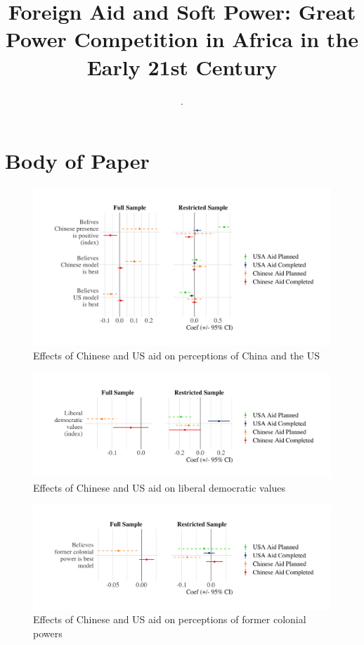 \documentclass[9pt]{article}
\title{Foreign Aid and Soft Power: Great Power Competition in Africa in the Early 21st Century}
\author{.}
\begin{document}
\maketitle
\tableofcontents

\setlength{\tabcolsep}{5pt}

\newpage
\section{Body of Paper}

\begin{figure}[H]
\centering
\includegraphics[width=1\textwidth]{figures/figure_01.png}
\caption{Effects of Chinese and US aid on perceptions of China and the US}
\end{figure}

\begin{figure}[H]
\centering
\includegraphics[width=1\textwidth]{figures/figure_02.png}
\caption{Effects of Chinese and US aid on liberal democratic values}
\end{figure}

\begin{figure}[H]
\centering
\includegraphics[width=1\textwidth]{figures/figure_03.png}
\caption{Effects of Chinese and US aid on perceptions of former colonial powers}
\end{figure}
\end{document}
